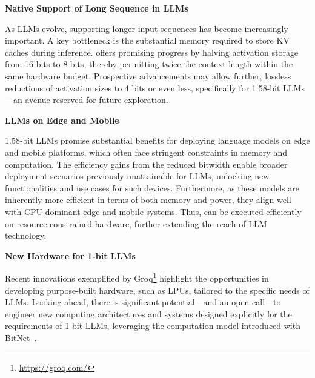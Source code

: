 \textbf{Native Support of Long Sequence in LLMs}

As LLMs evolve, supporting longer input sequences has become increasingly important. A key bottleneck is the substantial memory required to store KV caches during inference.  offers promising progress by halving activation storage from 16 bits to 8 bits, thereby permitting twice the context length within the same hardware budget. Prospective advancements may allow further, lossless reductions of activation sizes to 4 bits or even less, specifically for 1.58-bit LLMs—an avenue reserved for future exploration.

\textbf{LLMs on Edge and Mobile}

1.58-bit LLMs promise substantial benefits for deploying language models on edge and mobile platforms, which often face stringent constraints in memory and computation. The efficiency gains from the reduced bitwidth enable broader deployment scenarios previously unattainable for LLMs, unlocking new functionalities and use cases for such devices. Furthermore, as these models are inherently more efficient in terms of both memory and power, they align well with CPU-dominant edge and mobile systems. Thus,  can be executed efficiently on resource-constrained hardware, further extending the reach of LLM technology.

\textbf{New Hardware for 1-bit LLMs}

Recent innovations exemplified by Groq\footnote{\url{https://groq.com/}} highlight the opportunities in developing purpose-built hardware, such as LPUs, tailored to the specific needs of LLMs. Looking ahead, there is significant potential—and an open call—to engineer new computing architectures and systems designed explicitly for the requirements of 1-bit LLMs, leveraging the computation model introduced with BitNet~\cite{bitnet}.